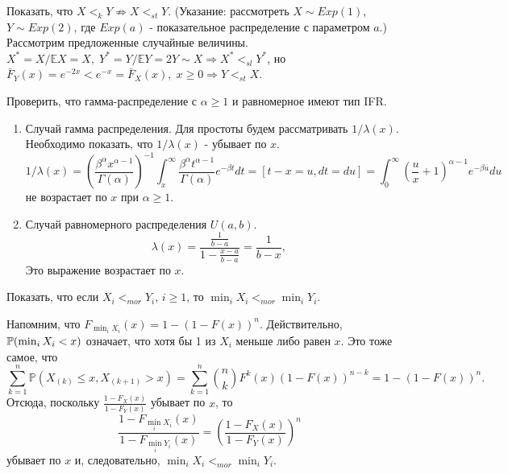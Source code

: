 \problem{}
Показать, что $X <_k Y \not\Rightarrow X <_{st} Y$. (Указание: рассмотреть $X \sim Exp(1)$, $Y \sim Exp(2)$, где $Exp(a)$ - показательное
распределение с параметром $a$.)
\solution{}
Рассмотрим предложенные случайные величины. $X^* = X/\mathbb EX = X, \; Y^* = Y/\mathbb E Y = 2 Y \sim X \Rightarrow X^*<_{sl} Y^*$, но $\bar F_Y(x) = e^{-2x} < e^{-x} = \bar F_X(x), \; x\geq 0 \Rightarrow Y<_{st}X$.

\problem{}
Проверить, что гамма-распределение с $\alpha \geq 1$ и равномерное имеют тип IFR.
\solution{}
\begin{enumerate}
    \item Случай гамма распределения. Для простоты будем рассматривать $1/\lambda(x)$. Необходимо показать, что $1/\lambda(x) $ - убывает по $x$. 
    \begin{equation*}
        1/\lambda(x) = \left( \frac{\beta^\alpha x^{\alpha - 1}}{\Gamma(\alpha)} \right)^{-1} \int_x^\infty \frac{\beta^\alpha t^{\alpha - 1}}{\Gamma(\alpha)}e^{-\beta t} dt = \left[ t - x = u, dt = du \right] = \int_0^\infty \left(\frac{u}{x} + 1\right)^{\alpha -1}e^{-\beta u} du
        \end{equation*}
        не возрастает по $x$ при $\alpha \geq 1$.

    \item Случай равномерного распределения $U(a,b)$.
    \begin{equation*}
        \lambda(x) =\frac{\frac{1}{b-a}}{1 - \frac{x - a}{b - a}} =  \frac{1}{b - x},
    \end{equation*}
    Это выражение возрастает по $x$.
\end{enumerate}

\problem{}
Показать, что если $X_i <_{mor} Y_i$, $i \geq 1$, то $\min_i X_i <_{mor} \min_i Y_i$.
\solution{}

Напомним, что $F_{\min_i X_i} (x) = 1 - (1 - F(x))^n$. Действительно, $\P( \min_i X_i < x) $ означает, что хотя бы 1 из $X_i$ меньше либо равен $x$. Это тоже самое, что
    \begin{equation*}
        \sum_{k =1}^n \mathbb{P}(X_{(k)} \leq x, X_{(k+1)} > x ) =  \sum_{k=1}^n \binom{n}{k} F^k(x)(1 - F(x))^{n-k} = 1 - (1 - F(x))^n.
    \end{equation*}
    Отсюда, поскольку $\frac{1 - F_X(x)}{1 - F_Y(x)}$ убывает по $x$, то 
    \begin{equation*}
        \frac{1 - F_{\min_i X_i}(x)}{ 1 - F_{\min_i Y_i}(x)} = \left( \frac{1 - F_X(x)}{ 1 - F_Y(x)} \right)^n
    \end{equation*}
    убывает по $x$ и, следовательно, $\min_i X_i <_{mor} \min_i Y_i$.